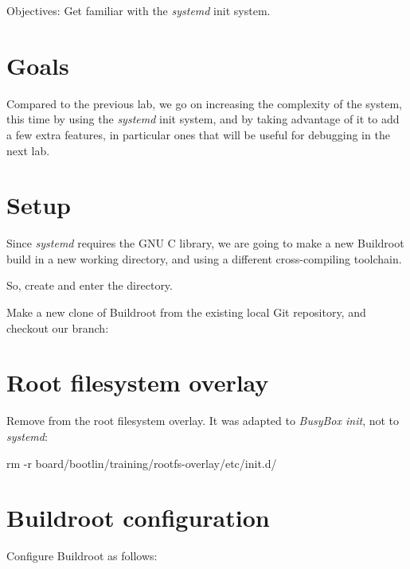   {Objectives: Get familiar with the {\em systemd} init system.}

\section{Goals}

Compared to the previous lab, we go on increasing the complexity
of the system, this time by using the {\em systemd} init system,
and by taking advantage of it to add a few extra features, in particular
ones that will be useful for debugging in the next lab.

\section{Setup}

Since {\em systemd} requires the GNU C library, we are going
to make a new Buildroot build in a new working directory, and
using a different cross-compiling toolchain.

So, create and enter the 
directory.

Make a new clone of Buildroot from the existing local Git repository,
and checkout our  branch:


\section{Root filesystem overlay}

Remove  from the root filesystem overlay.
It was adapted to {\em BusyBox init}, not to {\em systemd}:

\begin{bashinput}
rm -r board/bootlin/training/rootfs-overlay/etc/init.d/
\end{bashinput}

\section{Buildroot configuration}

Configure Buildroot as follows:

